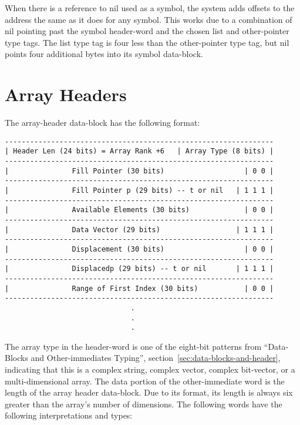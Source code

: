 When there is a reference to nil used as a symbol, the system adds offsets to
the address the same as it does for any symbol.  This works due to a
combination of nil pointing past the symbol header-word and the chosen list and
other-pointer type tags.  The list type tag is four less than the other-pointer
type tag, but nil points four additional bytes into its symbol data-block.



\section{Array Headers}

The array-header data-block has the following format:
\begin{verbatim}
----------------------------------------------------------------
| Header Len (24 bits) = Array Rank +6   | Array Type (8 bits) |
----------------------------------------------------------------
|               Fill Pointer (30 bits)                   | 0 0 | 
----------------------------------------------------------------
|               Fill Pointer p (29 bits) -- t or nil   | 1 1 1 |
----------------------------------------------------------------
|               Available Elements (30 bits)             | 0 0 | 
----------------------------------------------------------------
|               Data Vector (29 bits)                  | 1 1 1 | 
----------------------------------------------------------------
|               Displacement (30 bits)                   | 0 0 | 
----------------------------------------------------------------
|               Displacedp (29 bits) -- t or nil       | 1 1 1 | 
----------------------------------------------------------------
|               Range of First Index (30 bits)           | 0 0 | 
----------------------------------------------------------------
                              .
                              .
                              .

\end{verbatim}
The array type in the header-word is one of the eight-bit patterns from 
``Data-Blocks and Other-immediates Typing'', section~\ref{sec:data-blocks-and-header}, indicating that this is a complex
string, complex vector, complex bit-vector, or a multi-dimensional array.  The
data portion of the other-immediate word is the length of the array header
data-block.  Due to its format, its length is always six greater than the
array's number of dimensions.  The following words have the following
interpretations and types:

